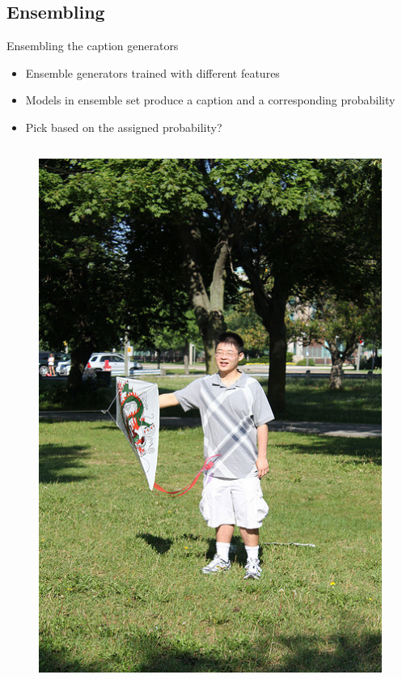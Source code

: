 \documentclass{beamer}
\begin{document}
\subsection{Ensembling}
\begin{frame}{Ensembling the caption generators}
\begin{itemize}
    \item Ensemble generators trained with different features
    \item Models in ensemble set produce a caption and a corresponding probability 
    \item Pick based on the assigned probability? 
\end{itemize}
\begin{columns}       
    \begin{figure}[h]
        \centering
        \includegraphics[width=1.0\linewidth]{images/COCO_val2014_000000530509.jpg}

\end{figure}
\end{columns}
\end{frame}
\end{document}
